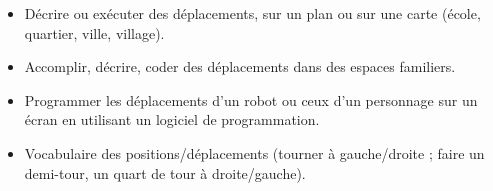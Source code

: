 \begin{prerequis}    
   \begin{itemize}
        \item[\emoji{diamond-suit}] Décrire ou exécuter des déplacements, sur un plan ou sur une carte (école, quartier, ville, village).
        \item[\emoji{diamond-suit}] Accomplir, décrire, coder des déplacements dans des espaces familiers.
        \columnbreak
        \item[\emoji{diamond-suit}] Programmer les déplacements d’un robot ou ceux d’un personnage sur un écran en utilisant un logiciel de programmation.
        \item[\emoji{red-heart}] Vocabulaire des positions/déplacements (tourner à gauche/droite ; faire un demi-tour, un quart de tour à droite/gauche).
   \end{itemize}
\end{prerequis}